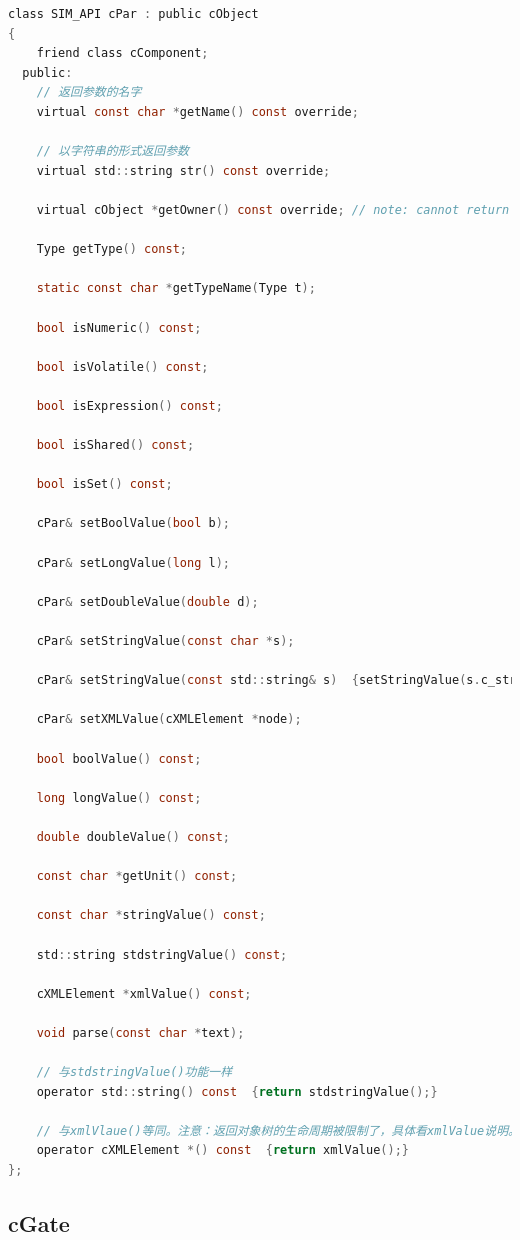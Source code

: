 \begin{lstlisting}[language=c]
class SIM_API cPar : public cObject
{
    friend class cComponent;
  public:
    // 返回参数的名字
    virtual const char *getName() const override;

    // 以字符串的形式返回参数
    virtual std::string str() const override;

    virtual cObject *getOwner() const override; // note: cannot return cComponent* (covariant return type) due to declaration order

    Type getType() const;

    static const char *getTypeName(Type t);

    bool isNumeric() const;

    bool isVolatile() const;

    bool isExpression() const;

    bool isShared() const;

    bool isSet() const;

    cPar& setBoolValue(bool b);

    cPar& setLongValue(long l);

    cPar& setDoubleValue(double d);

    cPar& setStringValue(const char *s);

    cPar& setStringValue(const std::string& s)  {setStringValue(s.c_str()); return *this;}

    cPar& setXMLValue(cXMLElement *node);

    bool boolValue() const;

    long longValue() const;

    double doubleValue() const;

    const char *getUnit() const;

    const char *stringValue() const;

    std::string stdstringValue() const;

    cXMLElement *xmlValue() const;

    void parse(const char *text);

    // 与stdstringValue()功能一样
    operator std::string() const  {return stdstringValue();}

    // 与xmlVlaue()等同。注意：返回对象树的生命周期被限制了，具体看xmlValue说明。
    operator cXMLElement *() const  {return xmlValue();}
};
\end{lstlisting}

\subsection{cGate}
\label{cgate}


